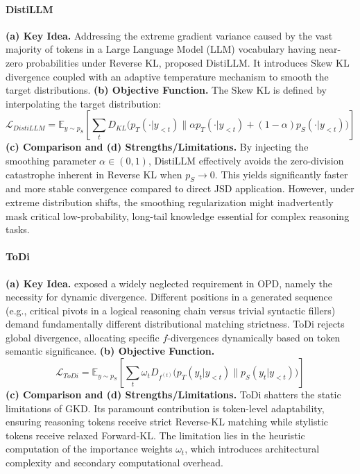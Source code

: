 \documentclass{article} %
\begin{document}
\paragraph{DistiLLM}
\textbf{(a) Key Idea.} Addressing the extreme gradient variance caused by the vast majority of tokens in a Large Language Model (LLM) vocabulary having near-zero probabilities under Reverse KL, \citet{2402.03898} proposed DistiLLM. It introduces Skew KL divergence coupled with an adaptive temperature mechanism to smooth the target distributions.
\textbf{(b) Objective Function.} The Skew KL is defined by interpolating the target distribution:
\begin{equation}
    \mathcal{L}_{DistiLLM} = \mathbb{E}_{y \sim p_S} \left[ \sum_t D_{KL}\big(p_T(\cdot|y_{<t}) \parallel \alpha p_T(\cdot|y_{<t}) + (1-\alpha) p_S(\cdot|y_{<t})\big) \right]
    \label{eq:distillm}
\end{equation}
\textbf{(c) Comparison and (d) Strengths/Limitations.} By injecting the smoothing parameter $\alpha \in (0, 1)$, DistiLLM effectively avoids the zero-division catastrophe inherent in Reverse KL when $p_S \to 0$. This yields significantly faster and more stable convergence compared to direct JSD application. However, under extreme distribution shifts, the smoothing regularization might inadvertently mask critical low-probability, long-tail knowledge essential for complex reasoning tasks.

\paragraph{ToDi}
\textbf{(a) Key Idea.} \citet{2505.16297} exposed a widely neglected requirement in OPD, namely the necessity for dynamic divergence. Different positions in a generated sequence (e.g., critical pivots in a logical reasoning chain versus trivial syntactic fillers) demand fundamentally different distributional matching strictness. ToDi rejects global divergence, allocating specific $f$-divergences dynamically based on token semantic significance.
\textbf{(b) Objective Function.}
\begin{equation}
    \mathcal{L}_{ToDi} = \mathbb{E}_{y \sim p_S} \left[ \sum_t \omega_t D_{f^{(t)}} \big( p_T(y_t|y_{<t}) \parallel p_S(y_t|y_{<t}) \big) \right]
    \label{eq:todi}
\end{equation}
\textbf{(c) Comparison and (d) Strengths/Limitations.} ToDi shatters the static limitations of GKD. Its paramount contribution is token-level adaptability, ensuring reasoning tokens receive strict Reverse-KL matching while stylistic tokens receive relaxed Forward-KL. The limitation lies in the heuristic computation of the importance weights $\omega_t$, which introduces architectural complexity and secondary computational overhead.
\end{document}
